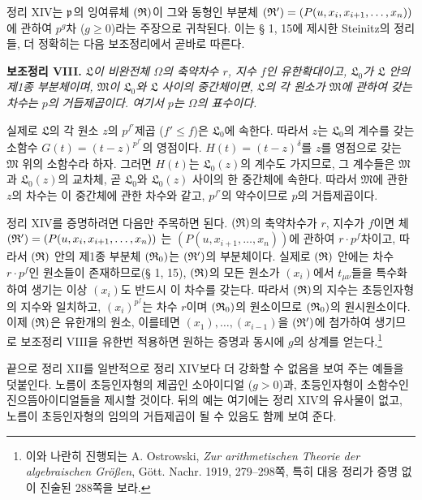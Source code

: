 정리 XIV는 \(\mathfrak p\)의 잉여류체 \((\mathfrak{R})\)이 그와 동형인 부분체
\(
(\mathfrak{R}')=(P(u,x_i,x_{i+1},\ldots,x_n))
\)
에 관하여 \(p^g\)차 (\(g\geq0\))라는 주장으로 귀착된다. 이는 § 1, 15에 제시한 Steinitz의 정리들, 더 정확히는 다음 보조정리에서 곧바로 따른다.

\textbf{보조정리 VIII.} \emph{\(\mathfrak L\)이 비완전체 \(\Omega\)의 축약차수 \(r\), 지수 \(f\)인 유한확대이고, \(\mathfrak L_0\)가 \(\mathfrak L\) 안의 제1종 부분체이며, \(\mathfrak M\)이 \(\mathfrak L_0\)와 \(\mathfrak L\) 사이의 중간체이면, \(\mathfrak L\)의 각 원소가 \(\mathfrak M\)에 관하여 갖는 차수는 \(p\)의 거듭제곱이다. 여기서 \(p\)는 \(\Omega\)의 표수이다.}

실제로 \(\mathfrak L\)의 각 원소 \(z\)의 \(p^{f'}\)제곱 (\(f'\leq f\))은 \(\mathfrak L_0\)에 속한다. 따라서 \(z\)는 \(\mathfrak L_0\)의 계수를 갖는 소함수 \(G(t)=(t-z)^{p^{f'}}\)의 영점이다. \(H(t)=(t-z)^\delta\)를 \(z\)를 영점으로 갖는 \(\mathfrak M\) 위의 소함수라 하자. 그러면 \(H(t)\)는 \(\mathfrak L_0(z)\)의 계수도 가지므로, 그 계수들은 \(\mathfrak M\)과 \(\mathfrak L_0(z)\)의 교차체, 곧 \(\mathfrak L_0\)와 \(\mathfrak L_0(z)\) 사이의 한 중간체에 속한다. 따라서 \(\mathfrak M\)에 관한 \(z\)의 차수는 이 중간체에 관한 차수와 같고, \(p^{f'}\)의 약수이므로 \(p\)의 거듭제곱이다.

정리 XIV를 증명하려면 다음만 주목하면 된다. \((\mathfrak{R})\)의 축약차수가 \(r\), 지수가 \(f\)이면 체
\(
(\mathfrak{R}')=(P(u,x_i,x_{i+1},\ldots,x_n))
\)
는 \((P(u,x_{i+1},\ldots,x_n))\)에 관하여 \(r\cdot p^f\)차이고, 따라서 \((\mathfrak{R})\) 안의 제1종 부분체 \((\mathfrak{R}_0)\)는 \((\mathfrak{R}')\)의 부분체이다. 실제로 \((\mathfrak{R})\) 안에는 차수 \(r\cdot p^f\)인 원소들이 존재하므로(§ 1, 15), \((\mathfrak{R})\)의 모든 원소가 \((x_i)\)에서 \(t_{\mu\nu}\)들을 특수화하여 생기는 이상 \((x_i)\)도 반드시 이 차수를 갖는다. 따라서 \((\mathfrak{R})\)의 지수는 초등인자형의 지수와 일치하고, \((x_i)^{p^f}\)는 차수 \(r\)이며 \((\mathfrak{R}_0)\)의 원소이므로 \((\mathfrak{R}_0)\)의 원시원소이다. 이제 \((\mathfrak{R})\)은 유한개의 원소, 이를테면 \((x_1),\ldots,(x_{i-1})\)을 \((\mathfrak{R}')\)에 첨가하여 생기므로 보조정리 VIII을 유한번 적용하면 원하는 증명과 동시에 \(g\)의 상계를 얻는다.\footnote{이와 나란히 진행되는 A. Ostrowski, \emph{Zur arithmetischen Theorie der algebraischen Größen}, Gött. Nachr. 1919, 279--298쪽, 특히 대응 정리가 증명 없이 진술된 288쪽을 보라.}

끝으로 정리 XII를 일반적으로 정리 XIV보다 더 강화할 수 없음을 보여 주는 예들을 덧붙인다. 노름이 초등인자형의 제곱인 소아이디얼 (\(g>0\))과, 초등인자형이 소함수인 진으뜸아이디얼들을 제시할 것이다. 뒤의 예는 여기에는 정리 XIV의 유사물이 없고, 노름이 초등인자형의 임의의 거듭제곱이 될 수 있음도 함께 보여 준다.

